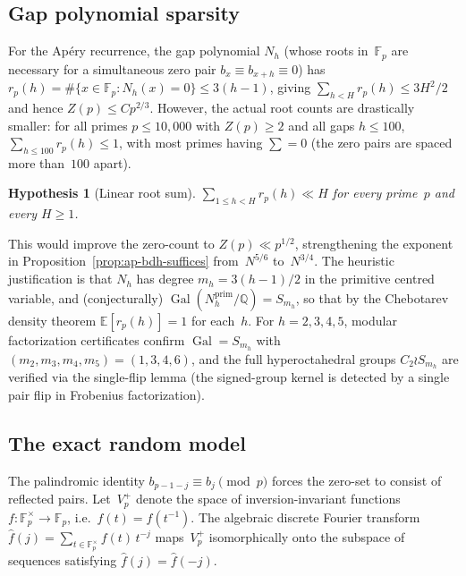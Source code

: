 \documentclass[11pt]{article}
\newtheorem{hypothesis}[theorem]{Hypothesis}
\theoremstyle{definition}
\theoremstyle{remark}
\begin{document}
\subsection{Gap polynomial sparsity}

For the Ap\'ery recurrence, the gap polynomial
$N_h$ (whose roots in~$\mathbb{F}_p$ are
necessary for a simultaneous zero pair
$b_x \equiv b_{x+h} \equiv 0$)
has $r_p(h) = \#\{x \in \mathbb{F}_p : N_h(x) = 0\}
\le 3(h-1)$, giving $\sum_{h < H} r_p(h) \le 3H^2/2$
and hence $Z(p) \le Cp^{2/3}$.
However, the actual root counts are drastically
smaller: for all primes $p \le 10{,}000$ with
$Z(p) \ge 2$ and all gaps $h \le 100$,
$\sum_{h \le 100} r_p(h) \le 1$,
with most primes having $\sum = 0$
(the zero pairs are spaced more than~$100$ apart).

\begin{hypothesis}[Linear root sum]\label{hyp:linear-root}
$\sum_{1 \le h < H} r_p(h) \ll H$ for every
prime~$p$ and every $H \ge 1$.
\end{hypothesis}

This would improve the zero-count to
$Z(p) \ll p^{1/2}$, strengthening the exponent
in Proposition~\ref{prop:ap-bdh-suffices}
from~$N^{5/6}$ to~$N^{3/4}$.
The heuristic justification is that $N_h$
has degree $m_h = 3(h{-}1)/2$ in the
primitive centred variable, and
(conjecturally)
$\operatorname{Gal}(N_h^{\mathrm{prim}}
/\mathbb{Q}) = S_{m_h}$,
so that by the Chebotarev density theorem
$\mathbb{E}[r_p(h)] = 1$ for each~$h$.
For $h = 2, 3, 4, 5$, modular
factorization certificates confirm
$\operatorname{Gal} = S_{m_h}$ with
$(m_2, m_3, m_4, m_5) = (1, 3, 4, 6)$,
and the full hyperoctahedral groups
$C_2 \wr S_{m_h}$ are verified
via the single-flip lemma
(the signed-group kernel is
detected by a single pair flip
in Frobenius factorization).

\subsection{The exact random model}\label{ssec:random-model}

The palindromic identity $b_{p-1-j} \equiv b_j \pmod{p}$
forces the zero-set to consist of reflected pairs.
Let~$V_p^+$ denote the space of inversion-invariant
functions $f \colon \mathbb{F}_p^\times \to \mathbb{F}_p$,
i.e.\ $f(t) = f(t^{-1})$.
The algebraic discrete Fourier transform
$\hat{f}(j) = \sum_{t \in \mathbb{F}_p^\times} f(t)\,t^{-j}$
maps~$V_p^+$ isomorphically onto the subspace of
sequences satisfying $\hat{f}(j) = \hat{f}(-j)$.
\end{document}
